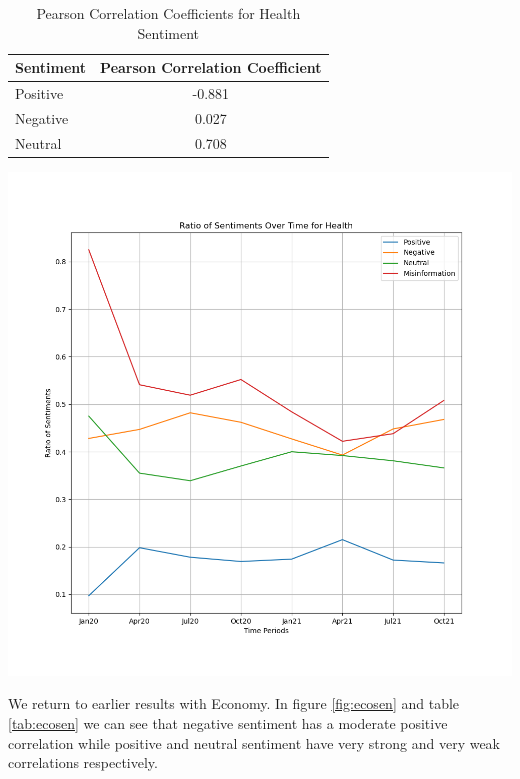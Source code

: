\documentclass{l4proj}
\begin{document}
\begin{table}[H]
\begin{minipage}[c]{0.30\linewidth}
\centering
\begin{tabular}{@{}ll@{}}
\toprule
Sentiment & Pearson Correlation Coefficient \\ \midrule
Positive  & \multicolumn{1}{c}{-0.881}      \\
Negative  & \multicolumn{1}{c}{0.027}       \\
Neutral   & \multicolumn{1}{c}{0.708}       \\ \bottomrule
\end{tabular}
\caption{Pearson Correlation Coefficients for Health Sentiment}
\label{tab:healthsen}
\end{minipage}\hfill
\begin{minipage}[c]{0.55\linewidth}
\centering
\includegraphics[width=\textwidth]{images/HealthSentiment.png}
\label{fig:healthsen}
\end{minipage}
\end{table}

We return to earlier results with Economy. In figure \ref{fig:ecosen} and table \ref{tab:ecosen} we can see that negative sentiment has a moderate positive correlation while positive and neutral sentiment have very strong and very weak correlations respectively.
\end{document}
